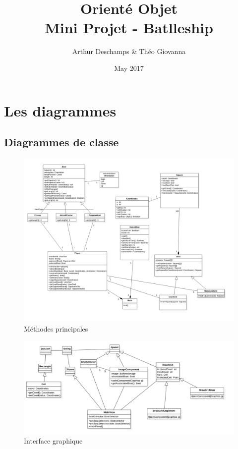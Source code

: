 \documentclass[a4paper,10pt]{article}
\title{Orienté Objet \\ Mini Projet - Batlleship}
\author{Arthur Deschamps \& Théo Giovanna }
\date{May 2017}
\begin{document}
\maketitle

\section{Les diagrammes}

\subsection{Diagrammes de classe}

\begin{figure}[H]
    \center
    \includegraphics[scale=0.50]{images/mainClass}
    \caption{Méthodes principales}
    \label{fig:my_label}
\end{figure}

\begin{figure}[H]
    \center
    \includegraphics[scale=0.45]{images/guiClass}
    \caption{Interface graphique}
    \label{fig:my_label}
\end{figure}
\end{document}
